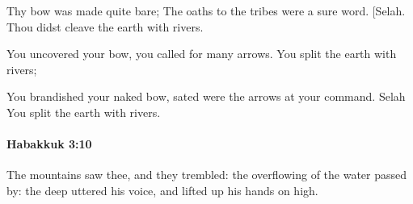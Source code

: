 			\begin{versebox}
					\item[BHS] 
					\item[LXX] 
					\item[ASV] Thy bow was made quite bare; The oaths to the tribes were a sure word. [Selah. Thou didst cleave the earth with rivers.
					\item[NIV] You uncovered your bow, you called for many arrows. You split the earth with rivers;
					\item[NRSV] You brandished your naked bow, sated were the arrows at your command. Selah You split the earth with rivers.
			\end{versebox}

		\paragraph{Habakkuk 3:10} %
			\label{HABAKKUK-3-10}

			The mountains saw thee, and they trembled: the overflowing of the water passed by: the deep uttered his voice, and lifted up his hands on high.

